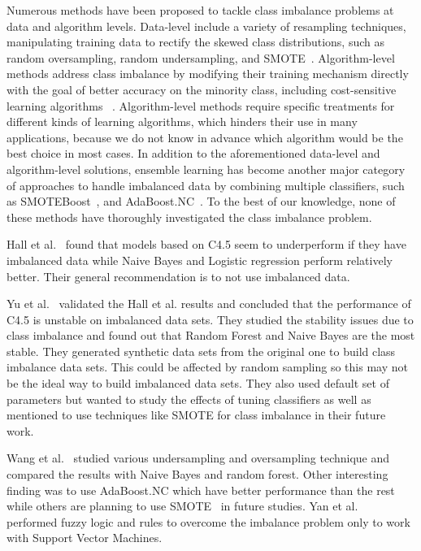 \documentclass[sigconf,review, anonymous]{acmart}
\theoremstyle{break}
\theoremstyle{break}
\begin{document}
Numerous methods have been proposed to tackle class
imbalance problems at data and algorithm levels. Data-level include a variety of resampling techniques, manipulating training data to rectify the skewed class distributions, such as random oversampling, random undersampling, and SMOTE~\cite{estabrooks2004multiple}. Algorithm-level methods address class imbalance by
modifying their training mechanism directly with the 
goal of better accuracy on the minority class, including cost-sensitive learning algorithms ~\cite{he2009learning}.
Algorithm-level methods require specific treatments for different
kinds of learning algorithms, which hinders their use
in many applications, because we do not know in advance
which algorithm would be the best choice in most cases. In addition to the aforementioned data-level and algorithm-level solutions, ensemble learning has become another major category of approaches to handle imbalanced data by combining multiple classifiers, such as SMOTEBoost~\cite{chawla2003smoteboost}, and
AdaBoost.NC~\cite{wang2010negative}. To 
the best of our knowledge, none of these methods have  thoroughly investigated the class imbalance problem.

Hall et al.~\cite{hall2012systematic} found that models based on C4.5 seem to underperform if they have imbalanced data while Naive Bayes and Logistic regression perform relatively better. 
Their general recommendation is to not use
imbalanced data.  

Yu et al.~\cite{yuperformance} validated the Hall et al. results and concluded that the
performance of C4.5 is unstable on imbalanced data sets. They studied the stability issues due to  class imbalance and found out that Random Forest and Naive Bayes are the most stable. They generated synthetic data sets from the original one to build class imbalance data sets. This could be affected by random sampling so this may not be the ideal way to build imbalanced data sets. They also used default set of parameters but wanted to study the effects of tuning classifiers as well as mentioned to use techniques like SMOTE for class imbalance in their future work.

Wang et al.~\cite{wang2013using} studied various undersampling and oversampling technique and compared the results with Naive Bayes and random forest. Other interesting finding was to use AdaBoost.NC which have better performance than the rest while others are planning to use SMOTE~\cite{gray2009using} in future studies. Yan et al.~\cite{yan2010software} performed fuzzy logic and rules to overcome the imbalance problem only to work with Support Vector Machines. 
\end{document}
